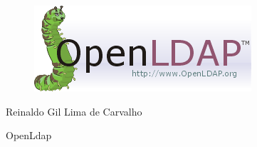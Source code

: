 \thispagestyle{empty}

\begin{center}
  \begin{figure}[H]
    \begin{center}
      \hspace{-1cm}
      \includegraphics[width=0.55\columnwidth]{titlepage}
    \end{center}      
  \end{figure}

  \vskip 2cm

  \hspace{-1cm}
  \begin{minipage}[c]{12cm}
    \begin{center}

{\Huge {}\vskip 0.15cm

{\large Reinaldo Gil Lima de Carvalho}
}
    \end{center}
  \end{minipage}

  \vskip 16cm

  {\Huge OpenLdap}

\end{center}
